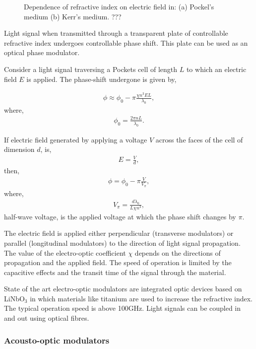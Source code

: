 \begin{figure}[!htbp]
\caption{Dependence of refractive index on electric field in: (a) Pockel's medium (b) Kerr's medium. ???}
\end{figure}

Light signal when transmitted through a transparent plate of controllable refractive index undergoes controllable phase shift. This plate can be used as an optical phase modulator.

Consider a light signal traversing a Pockets cell of length $L$ to which an electric field $E$ is applied. The phase-shift undergone is given by,

\begin{align}
\phi \approx \phi_0 - \pi\frac{\chi n^3 E L}{\lambda_0},
\end{align}
where,
\begin{align}
\phi_0 = \frac{2\pi nL}{\lambda_0}.
\end{align}

If electric field generated by applying a voltage $V$ across the faces of the cell of dimension $d$, is,
\begin{align}
	E=\frac{V}{d},
\end{align}
then,
\begin{align}
	\phi=\phi_0-\pi \frac{V}{V_\pi},
\end{align}
where,
\begin{align}
	V_\pi=\frac{d\lambda_0}{L\chi n^3},
\end{align}
half-wave voltage, is the applied voltage at which the phase shift changes by $\pi$.

The electric field is applied either perpendicular (transverse modulators) or parallel (longitudinal modulators) to the direction of light signal propagation. The value of the electro-optic coefficient $\chi$ depends on the directions of propagation and the applied field. The speed of operation is limited by the capacitive effects and the transit time of the signal through the material. 

State of the art electro-optic modulators are integrated optic devices based on LiNbO$_3$ in which materials like titanium are used to increase the refractive index. The typical operation speed is above 100GHz. Light signals can be coupled in and out using optical fibres.

%
%

\subsubsection{Acousto-optic modulators} 

